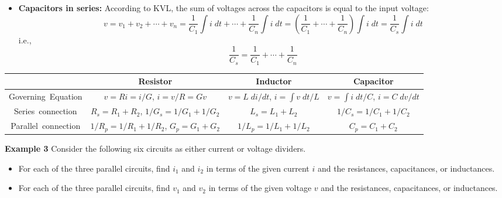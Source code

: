 \begin{itemize}
\begin{itemize}
\item {\bf Capacitors in series:} According to KVL, the sum of voltages across 
  the capacitors is equal to the input voltage:
  \[	
  v=v_1+v_2+\cdots+v_n
  =\frac{1}{C_1}\int i\;dt+\cdots+\frac{1}{C_n}\int i\;dt 
  =\left(\frac{1}{C_1}+\cdots+\frac{1}{C_n}\right)\int i\;dt
  =\frac{1}{C_s}\int i\;dt 	
  \]
  i.e.,
  \[	\frac{1}{C_s}=\frac{1}{C_1}+\cdots+\frac{1}{C_n} \]

\end{itemize}

\begin{tabular}{c||c|c|c}\hline
  & \mbox{Resistor} & \mbox{Inductor} & \mbox{Capacitor} \\ \hline \hline
  \mbox{Governing Equation} & $v=Ri=i/G$, $i=v/R=Gv$ & $v=L\;di/dt$, $i=\int v\; dt/L$ & $v=\int i\;dt/C$, $i=C\;dv/dt$ \\ \hline
  \mbox{Series connection}   & $R_s=R_1+R_2$, $1/G_s=1/G_1+1/G_2$ 
  & $L_s=L_1+L_2$ & $1/C_s=1/C_1+1/C_2$ \\ \hline
  \mbox{Parallel connection} & $1/R_p=1/R_1+1/R_2$, $G_p=G_1+G_2$
  & $1/L_p=1/L_1+1/L_2$ & $C_p=C_1+C_2$ \\ \hline
\end{tabular}

{\bf Example 3} Consider the following six circuits as either current
or voltage dividers.


\begin{itemize}
\item For each of the three parallel circuits, find $i_1$ and $i_2$ in
  terms of the given current $i$ and the resistances, capacitances, or
  inductances.
  \begin{comment}
  \begin{itemize}
  \item Resistor circuit:
    \[
    i_1=\frac{R_2}{R_1+R_2}i,\;\;\;i_2=\frac{R_1}{R_1+R_2}i
    \]
  \item Capacitor circuit:
    \[
    i_1=\frac{C_1}{C_1+C_2}i,\;\;\;i_2=\frac{C_2}{C_1+C_2}i
    \]
  \item Inductor circuit:
    \[
    i_1=\frac{L_2}{L_1+L_2}i,\;\;\;i_2=\frac{L_1}{L_1+L_2}i
    \]
  \end{itemize}
  \end{comment}
\item For each of the three parallel circuits, find $v_1$ and $v_2$ in
  terms of the given voltage $v$ and the resistances, capacitances, or 
  inductances.
  \begin{comment}
  \item Resistor circuit:
    \[
    v_1=\frac{R_1}{R_1+R_2}v,\;\;\;v_2=\frac{R_2}{R_1+R_2}v
    \]
  \item Capacitor circuit:
    \[
    v_1=\frac{C_2}{C_1+C_2}v,\;\;\;v_2=\frac{C_1}{C_1+C_2}v
    \]
  \item Inductor circuit:
    \[
    v_1=\frac{L_1}{L_1+L_2}v,\;\;\;v_2=\frac{L_2}{L_1+L_2}v
    \]
  \end{itemize}
  \end{comment}


\end{itemize}
\end{itemize}
